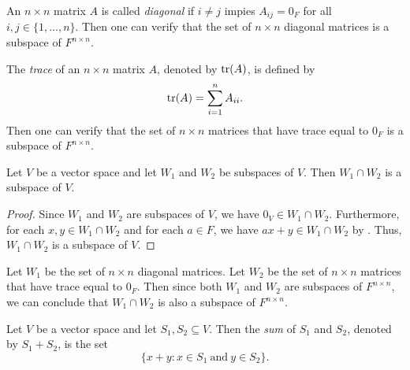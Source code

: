 \begin{example}
  An $n \times n$ matrix $A$ is called \emph{diagonal} if $i \neq j$ impies
  $A_{ij} = 0_F$ for all $i, j \in \{1, \dots, n\}$.
  Then one can verify that the set of $n \times n$ diagonal matrices is a
  subspace of $F^{n \times n}$.
\end{example}

\begin{example}
  The \emph{trace} of an $n \times n$ matrix $A$, denoted by $\operatorname{tr}(A)$, is
  defined by
  \begin{equation*}
    \operatorname{tr}(A) = \sum_{i=1}^n A_{ii}.
  \end{equation*}
  Then one can verify that the set of $n \times n$ matrices that have trace
  equal to $0_F$ is a subspace of $F^{n \times n}$.
\end{example}

\begin{proposition}\label{prop:subspace-intersection}
  Let $V$ be a vector space and let $W_1$ and $W_2$ be subspaces of $V$.
  Then $W_1 \cap W_2$ is a subspace of $V$.
\end{proposition}
\begin{proof}
  Since $W_1$ and $W_2$ are subspaces of $V$, we have $0_V \in W_1 \cap W_2$.
  Furthermore, for each $x, y \in W_1 \cap W_2$ and for each $a \in F$, we have
  $ax + y \in W_1 \cap W_2$ by .
  Thus, $W_1 \cap W_2$ is a subspace of $V$.
\end{proof}

\begin{example}
  Let $W_1$ be the set of $n \times n$ diagonal matrices.
  Let $W_2$ be the set of $n \times n$ matrices that have trace equal to $0_F$.
  Then since both $W_1$ and $W_2$ are subspaces of $F^{n \times n}$,
  we can conclude that $W_1 \cap W_2$ is also a subspace of $F^{n \times n}$.
\end{example}

\begin{definition}\label{def:sum}
  Let $V$ be a vector space and let $S_1, S_2 \subseteq V$.
  Then the \emph{sum} of $S_1$ and $S_2$, denoted by $S_1 + S_2$, is the set
  \begin{equation*}
    \{x + y: x \in S_1\ \text{and}\ y \in S_2\}.
  \end{equation*}
\end{definition}

